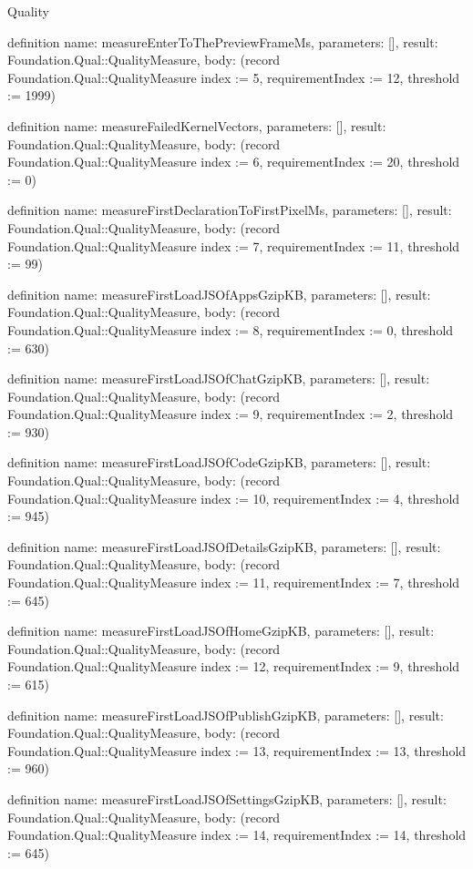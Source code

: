 \begin{lexlean}{Quality}
\begin{semanticmodule}
definition{
  name: measureEnterToThePreviewFrameMs,
  parameters: [],
  result: Foundation.Qual::QualityMeasure,
  body: (record Foundation.Qual::QualityMeasure {index := 5, requirementIndex := 12, threshold := 1999})
}

definition{
  name: measureFailedKernelVectors,
  parameters: [],
  result: Foundation.Qual::QualityMeasure,
  body: (record Foundation.Qual::QualityMeasure {index := 6, requirementIndex := 20, threshold := 0})
}

definition{
  name: measureFirstDeclarationToFirstPixelMs,
  parameters: [],
  result: Foundation.Qual::QualityMeasure,
  body: (record Foundation.Qual::QualityMeasure {index := 7, requirementIndex := 11, threshold := 99})
}

definition{
  name: measureFirstLoadJSOfAppsGzipKB,
  parameters: [],
  result: Foundation.Qual::QualityMeasure,
  body: (record Foundation.Qual::QualityMeasure {index := 8, requirementIndex := 0, threshold := 630})
}

definition{
  name: measureFirstLoadJSOfChatGzipKB,
  parameters: [],
  result: Foundation.Qual::QualityMeasure,
  body: (record Foundation.Qual::QualityMeasure {index := 9, requirementIndex := 2, threshold := 930})
}

definition{
  name: measureFirstLoadJSOfCodeGzipKB,
  parameters: [],
  result: Foundation.Qual::QualityMeasure,
  body: (record Foundation.Qual::QualityMeasure {index := 10, requirementIndex := 4, threshold := 945})
}

definition{
  name: measureFirstLoadJSOfDetailsGzipKB,
  parameters: [],
  result: Foundation.Qual::QualityMeasure,
  body: (record Foundation.Qual::QualityMeasure {index := 11, requirementIndex := 7, threshold := 645})
}

definition{
  name: measureFirstLoadJSOfHomeGzipKB,
  parameters: [],
  result: Foundation.Qual::QualityMeasure,
  body: (record Foundation.Qual::QualityMeasure {index := 12, requirementIndex := 9, threshold := 615})
}

definition{
  name: measureFirstLoadJSOfPublishGzipKB,
  parameters: [],
  result: Foundation.Qual::QualityMeasure,
  body: (record Foundation.Qual::QualityMeasure {index := 13, requirementIndex := 13, threshold := 960})
}

definition{
  name: measureFirstLoadJSOfSettingsGzipKB,
  parameters: [],
  result: Foundation.Qual::QualityMeasure,
  body: (record Foundation.Qual::QualityMeasure {index := 14, requirementIndex := 14, threshold := 645})
}


\end{semanticmodule}
\end{lexlean}
